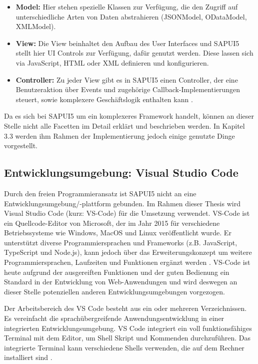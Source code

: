 \begin{itemize}[noitemsep]
\item \textbf{Model:} Hier stehen spezielle Klassen zur Verfügung, die den Zugriff auf unterschiedliche Arten von Daten abstrahieren (JSONModel, ODataModel, XMLModel).
\item \textbf{View:} Die View beinhaltet den Aufbau des User Interfaces und SAPUI5 stellt hier UI Controls zur Verfügung, dafür genutzt werden. Diese lassen sich via JavaScript, HTML oder XML definieren und konfigurieren.
\item \textbf{Controller:} Zu jeder View gibt es in SAPUI5 einen Controller, der eine Benutzeraktion über Events und zugehörige Callback-Implementierungen steuert, sowie komplexere Geschäftslogik enthalten kann \cite[S.149]{sapui5}.
\end{itemize}

Da es sich bei SAPUI5 um ein komplexeres Framework handelt, können an dieser Stelle nicht alle Facetten im Detail erklärt und beschrieben werden. In Kapitel 3.3 werden ihm Rahmen der Implementierung jedoch einige genutzte Dinge vorgestellt.

\subsection{Entwicklungsumgebung: Visual Studio Code}
Durch den freien Programmieransatz ist SAPUI5 nicht an eine Entwicklungsumgebung/-plattform gebunden. Im Rahmen dieser Thesis wird Visual Studio Code (kurz: VS-Code) für die Umsetzung verwendet. VS-Code ist ein Quellcode-Editor von Microsoft, der im Jahr 2015 für verschiedene Betriebssysteme wie Windows, MacOS und Linux veröffentlicht wurde. Er unterstützt diverse Programmiersprachen und Frameworks (z.B. JavaScript, TypeScript und Node.js), kann jedoch über das Erweiterungskonzept um weitere Programmiersprachen, Laufzeiten und Funktionen ergänzt werden \cite{vsc:ov}. VS-Code ist heute aufgrund der ausgereiften Funktionen und der guten Bedienung ein Standard in der Entwicklung von Web-Anwendungen \cite{wiki:vsc} und wird deswegen an dieser Stelle potenziellen anderen Entwicklungsumgebungen vorgezogen.

Der Arbeitsbereich des VS Code besteht aus ein oder mehreren Verzeichnissen. Es vereinfacht die sprachübergreifende Anwendungsentwicklung in einer integrierten Entwicklungsumgebung. VS Code integriert ein voll funktionsfähiges Terminal mit dem Editor, um Shell Skript und Kommenden durchzuführen. Das integrierte Terminal kann verschiedene Shells verwenden, die auf dem Rechner installiert sind \cite{vsc:tb}.

